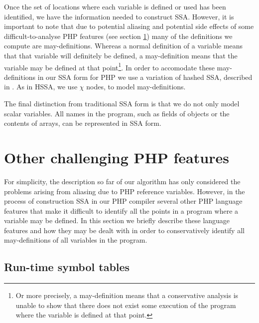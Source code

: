 Once the set of locations where each variable is defined or used has
been identified, we have the information needed to construct SSA.
However, it is important to note that due to potential aliasing and
potential side effects of some difficult-to-analyse PHP features (see
section \ref{other-difficult-features}) many of the definitions we
compute are may-definitions. Whereas a normal definition of a variable
means that that variable will definitely be defined, a may-definition
means that the variable may be defined at that point\footnote{Or more
  precisely, a may-definition means that a conservative analysis is
  unable to show that there does not exist some execution of the
  program where the variable is defined at that point.}. In order to
accomodate these may-definitions in our SSA form for PHP we use a
variation of hashed SSA, described in . As in HSSA, we
use $\chi$ nodes, to model may-definitions.

The final distinction from traditional SSA form is that we do not only
model scalar variables.  All names in the program, such as fields of
objects or the contents of arrays, can be represented in SSA form.


\section{Other challenging PHP features}
\label{other-difficult-features}

For simplicity, the description so far of our algorithm has only
considered the problems arising from aliasing due to PHP reference
variables. However, in the process of construction SSA in our PHP
compiler several other PHP language features that make it difficult to
identify all the points in a program where a variable may be
defined. In this section we briefly describe these language features
and how they may be dealt with in order to conservatively identify all
may-definitions of all variables in the program.

\subsection{Run-time symbol tables}
\label{run-time-tables}

